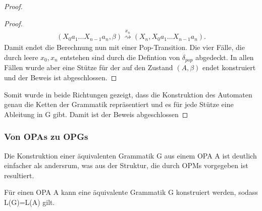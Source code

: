 \begin{proof}
\begin{proof}
\begin{eqnarray*}
(X_0a_1...X_{n-1}a_n, \beta) \stackrel{x_n}{\rightsquigarrow} (X_n, X_0a_1...X_{n-1}a_n).
\end{eqnarray*}
Damit endet die Berechnung nun mit einer Pop-Transition. Die vier Fälle, die durch leere $x_0, x_n$ entstehen sind durch die Defintion von $\delta_{pop}$ abgedeckt. In allen Fällen wurde aber eine Stütze für der auf den Zustand $(A, \beta)$ endet konstruiert und der Beweis ist abgeschlossen.
\end{proof}
Somit wurde in beide Richtungen gezeigt, dass die Konstruktion des Automaten genau die Ketten der Grammatik repräsentiert und es für jede Stütze eine Ableitung in G gibt. Damit ist der Beweis abgeschlossen 
\end{proof}


\subsubsection{Von OPAs zu OPGs}
Die Konstruktion einer äquivalenten Grammatik G aus einem OPA A ist deutlich einfacher als andersrum, was aus der Struktur, die durch OPMs vorgegeben ist resultiert.
\begin{lemma}
Für einen OPA A kann eine äquivalente Grammatik G konstruiert werden, sodass L(G)=L(A) gilt.
\end{lemma}
